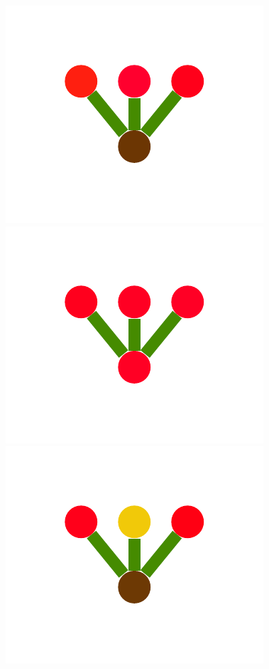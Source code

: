 \documentclass[a4paper,10pt]{article}
\begin{document}
\begin{figure}
{    \includegraphics[scale=.26]{../figures/vector/4-2-2-mergeprog-pre-6.pdf}
    \includegraphics[scale=.26]{../figures/vector/4-2-2-mergeprog-pre-7.pdf}
    \includegraphics[scale=.26]{../figures/vector/4-2-2-mergeprog-pre-8.pdf}
    \label{fig:merge-orig}
    }
\end{figure}
\end{document}

